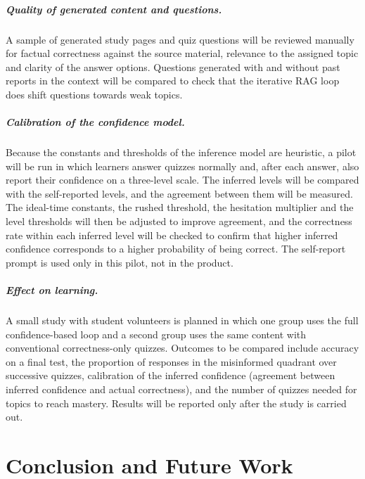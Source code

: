 \documentclass[12pt,a4paper,oneside]{report}
\begin{document}
\paragraph{Quality of generated content and questions.} A sample of
generated study pages and quiz questions will be reviewed manually for
factual correctness against the source material, relevance to the
assigned topic and clarity of the answer options. Questions generated with
and without past reports in the context will be compared to check that the
iterative RAG loop does shift questions towards weak topics.

\paragraph{Calibration of the confidence model.} Because the constants
and thresholds of the inference model are heuristic, a pilot will be run
in which learners answer quizzes normally and, after each answer, also
report their confidence on a three-level scale. The inferred levels will be
compared with the self-reported levels, and the agreement between them
will be measured. The ideal-time constants, the rushed threshold, the
hesitation multiplier and the level thresholds will then be adjusted to
improve agreement, and the correctness rate within each inferred level
will be checked to confirm that higher inferred confidence corresponds to
a higher probability of being correct. The self-report prompt is used only
in this pilot, not in the product.

\paragraph{Effect on learning.} A small study with student volunteers is
planned in which one group uses the full confidence-based loop and a
second group uses the same content with conventional correctness-only
quizzes. Outcomes to be compared include accuracy on a final test, the
proportion of responses in the misinformed quadrant over successive
quizzes, calibration of the inferred confidence (agreement between
inferred confidence and actual correctness), and the number of quizzes needed for topics to
reach mastery. Results will be reported only after the study is carried
out.

\chapter{Conclusion and Future Work}\label{ch:concl}
\end{document}
